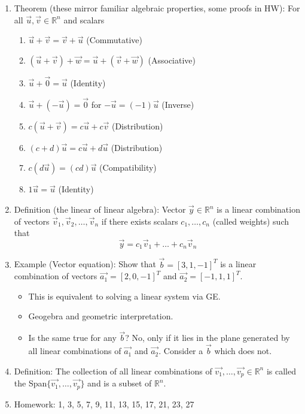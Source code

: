 \documentclass{article}
\begin{document}
\begin{enumerate}
\item Theorem (these mirror familiar algebraic properties, some proofs in HW): For all $\vec{u}, \vec{v} \in \mathbb{R}^n$ and scalars
\begin{enumerate}
\item $\vec{u}+\vec{v} = \vec{v}+\vec{u}$ (Commutative)
\item $(\vec{u}+\vec{v})+\vec{w} = \vec{u}+(\vec{v}+\vec{w})$ (Associative)
\item $\vec{u}+\vec{0}=\vec{u}$ (Identity)
\item $\vec{u} + (-\vec{u}) = \vec{0}$ for $-\vec{u} = (-1)\vec{u}$ (Inverse)
\item $c(\vec{u}+\vec{v}) = c\vec{u}+c\vec{v}$ (Distribution)
\item $(c+d)\vec{u} = c\vec{u}+d\vec{u}$ (Distribution)
\item $c(d\vec{u}) = (cd)\vec{u}$ (Compatibility)
\item $1\vec{u} = \vec{u}$ (Identity)	
\end{enumerate}

\item Definition (the linear of linear algebra): Vector $\vec{y} \in \mathbb{R}^n$ is a linear combination of vectors $\vec{v}_1, \vec{v}_2, \dots, \vec{v}_n$ if there exists scalars $c_1, \dots , c_n$ (called weights) such that 
\[
\vec{y} = c_1 \vec{v}_1 + \dots + c_n\vec{v}_n
\]

\item Example (Vector equation): Show that $\vec{b} = [3,1,-1]^T$ is a linear combination of vectors $\vec{a_1}=[2,0,-1]^T$ and $\vec{a_2} = [-1,1,1]^T$.
\begin{itemize}
\item This is equivalent to solving a linear system via GE.
\item Geogebra and geometric interpretation.
\item Is the same true for any $\vec{b}$? No, only if it lies in the plane generated by all linear combinations of $\vec{a_1}$ and $\vec{a_2}$. Consider a $\vec{b}$ which does not. 
\end{itemize}


\item Definition: The collection of all linear combinations of $\vec{v_1}, \dots, \vec{v_p} \in \mathbb{R}^n$ is called the Span$\{\vec{v_1}, \dots, \vec{v_p} \}$ and is a subset of $\mathbb{R}^n$.

\item Homework: 1, 3, 5, 7, 9, 11, 13, 15, 17, 21, 23, 27

\end{enumerate}
\end{document}
